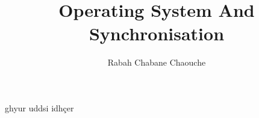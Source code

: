 \documentclass{article}
\title{Operating System And Synchronisation}
\author{Rabah Chabane Chaouche }
\begin{document}
 \maketitle
   
  ghyur uddsi
   idhçer
\end{document}
